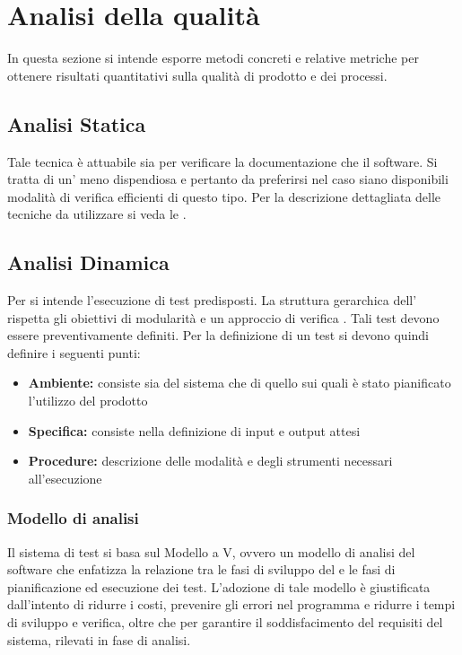 \documentclass[12pt,a4paper]{article}
\begin{document}
	
	\newpage
	
	\section{Analisi della qualità}\label{analisi}
	
	In questa sezione si intende esporre metodi concreti e relative metriche per ottenere risultati quantitativi sulla qualità di prodotto e dei processi. 
	
	\subsection{Analisi Statica} 
	Tale tecnica è attuabile sia per verificare la documentazione che il software. Si tratta di un' meno dispendiosa e pertanto da preferirsi nel caso siano disponibili modalità di verifica efficienti di questo tipo. Per la descrizione dettagliata delle tecniche da utilizzare si veda le \NdP.
	
	\subsection{Analisi Dinamica} 
	Per  si intende l'esecuzione di test predisposti. La struttura gerarchica dell' rispetta gli obiettivi di modularità e un approccio di verifica . Tali test devono essere preventivamente definiti. Per la definizione di un test si devono quindi definire i seguenti punti:
	
	\begin{itemize}
		\item \textbf{Ambiente:} consiste sia del sistema  che di quello  sui quali è stato pianificato l'utilizzo del prodotto
		\item \textbf{Specifica:} consiste nella definizione di input e output attesi
		\item \textbf{Procedure:} descrizione delle modalità e degli strumenti necessari all'esecuzione
	\end{itemize}
		
	\subsubsection{Modello di analisi}\label{test_strategia}
		Il sistema di test si basa sul Modello a V, ovvero un modello di analisi del software che enfatizza la relazione tra le fasi di sviluppo del  e le fasi di pianificazione ed esecuzione dei test. L'adozione di tale modello è giustificata dall'intento di ridurre i costi, prevenire gli errori nel programma e ridurre i tempi di sviluppo e verifica, oltre che per garantire il soddisfacimento del requisiti del sistema, rilevati in fase di analisi.
		
\end{document}
